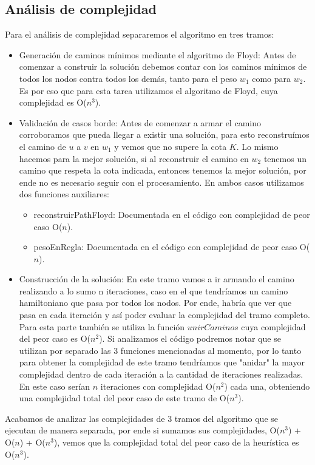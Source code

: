 \newpage
\subsection{An\'alisis de complejidad}
Para el an\'alisis de complejidad separaremos el algoritmo en tres tramos:
\begin{itemize}
\item Generaci\'on de caminos m\'inimos mediante el algoritmo de Floyd:
	Antes de comenzar a construir la soluci\'on debemos contar con los caminos m\'inimos de todos los nodos contra todos los dem\'as, tanto para el peso $w_1$ como para $w_2$. Es por eso que para esta tarea utilizamos el algoritmo de Floyd, cuya complejidad es O($n^3$). 
\item Validaci\'on de casos borde:
	Antes de comenzar a armar el camino corroboramos que pueda llegar a existir una soluci\'on, para esto reconstru\'imos el camino de $u$ a $v$ en $w_1$ y vemos que no supere la cota $K$. 
	Lo mismo hacemos para la mejor soluci\'on, si al reconstruir el camino en $w_2$ tenemos un camino que respeta la cota indicada, entonces tenemos la mejor soluci\'on, por ende no es necesario seguir con el procesamiento.
	En ambos casos utilizamos dos funciones auxiliares:
	\begin{itemize}
	\item reconstruirPathFloyd: Documentada en el c\'odigo con complejidad de peor caso O($n$).
	\item pesoEnRegla: Documentada en el c\'odigo con complejidad de peor caso O($n$).
	\end{itemize}
\item Construcci\'on de la soluci\'on:
	En este tramo vamos a ir armando el camino realizando a lo sumo n iteraciones, caso en el que tendr\'iamos un camino hamiltoniano que pasa por todos los nodos. Por ende, habr\'ia que ver que pasa en cada iteraci\'on y as\'i poder evaluar la complejidad del tramo completo.
	Para esta parte tambi\'en se utiliza la funci\'on $unirCaminos$ cuya complejidad del peor caso es O($n^2$).
	Si analizamos el c\'odigo podremos notar que se utilizan por separado las 3 funciones mencionadas al momento, por lo tanto para obtener la complejidad de este tramo tendr\'iamos que "anidar" la mayor complejidad dentro de cada iteraci\'on a la cantidad de iteraciones realizadas. En este caso ser\'ian $n$ iteraciones con complejidad O($n^2$) cada una, obteniendo una complejidad total del peor caso de este tramo de O($n^3$).
\end{itemize}

Acabamos de analizar las complejidades de 3 tramos del algoritmo que se ejecutan de manera separada, por ende si sumamos sus complejidades, O($n^3$) + O($n$) + O($n^3$), vemos que la complejidad total del peor caso de la heur\'istica es O($n^3$).

